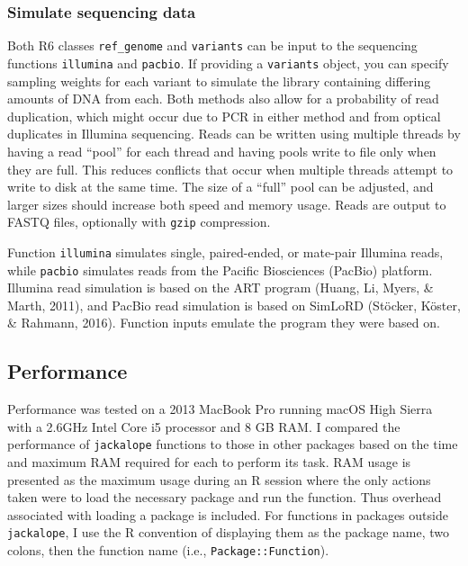 \documentclass[12pt,]{article}
\begin{document}
\hypertarget{simulate-sequencing-data}{%
\subsubsection{Simulate sequencing
data}\label{simulate-sequencing-data}}

Both R6 classes \texttt{ref\_genome} and \texttt{variants} can be input
to the sequencing functions \texttt{illumina} and \texttt{pacbio}. If
providing a \texttt{variants} object, you can specify sampling weights
for each variant to simulate the library containing differing amounts of
DNA from each. Both methods also allow for a probability of read
duplication, which might occur due to PCR in either method and from
optical duplicates in Illumina sequencing. Reads can be written using
multiple threads by having a read ``pool'' for each thread and having
pools write to file only when they are full. This reduces conflicts that
occur when multiple threads attempt to write to disk at the same time.
The size of a ``full'' pool can be adjusted, and larger sizes should
increase both speed and memory usage. Reads are output to FASTQ files,
optionally with \texttt{gzip} compression.

Function \texttt{illumina} simulates single, paired-ended, or mate-pair
Illumina reads, while \texttt{pacbio} simulates reads from the Pacific
Biosciences (PacBio) platform. Illumina read simulation is based on the
ART program (Huang, Li, Myers, \& Marth, 2011), and PacBio read
simulation is based on SimLoRD (Stöcker, Köster, \& Rahmann, 2016).
Function inputs emulate the program they were based on.

\hypertarget{performance}{%
\subsection{Performance}\label{performance}}

Performance was tested on a 2013 MacBook Pro running macOS High Sierra
with a 2.6GHz Intel Core i5 processor and 8 GB RAM. I compared the
performance of \texttt{jackalope} functions to those in other packages
based on the time and maximum RAM required for each to perform its task.
RAM usage is presented as the maximum usage during an R session where
the only actions taken were to load the necessary package and run the
function. Thus overhead associated with loading a package is included.
For functions in packages outside \texttt{jackalope}, I use the R
convention of displaying them as the package name, two colons, then the
function name (i.e., \texttt{Package::Function}).
\end{document}
